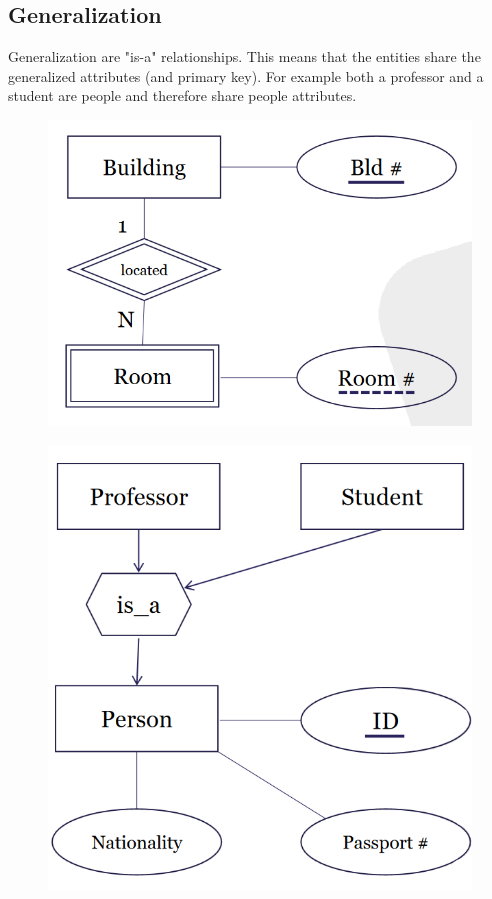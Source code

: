 \subsection{Generalization}
Generalization are "is-a" relationships. This means that the entities share the generalized attributes (and primary key). For example both a professor and a student are people and therefore share people attributes.
\begin{figure}[H]
\begin{minipage}[t]{.5\textwidth}
\centering
\includegraphics[width=.8\textwidth]{images/weak_entity.PNG}
\label{weak_entity}
\end{minipage}
\begin{minipage}[t]{.5\textwidth}
\centering
\includegraphics[width=.8\textwidth]{images/generalization.PNG}
\label{generalization}
\end{minipage}
\end{figure}

